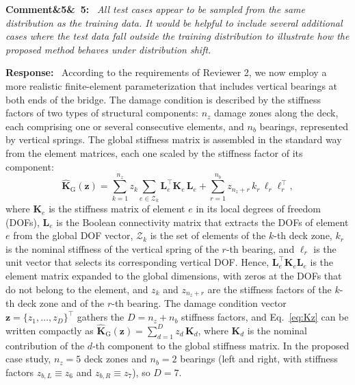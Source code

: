 \documentclass[11pt]{article}
\newenvironment{rcomment}[1]{\par\bigskip\noindent\textbf{Comment\ifx&#1&\else\ #1\fi:}\ \itshape}{\par}
\newenvironment{response}{\par\smallskip\noindent\color{resp}\textbf{Response:}\ }{\par}
\newcommand{\z}{\mathbf{z}}
\begin{document}
\begin{rcomment}{5}
All test cases appear to be sampled from the same distribution as the training data. It would be helpful to include several additional cases where the test data fall outside the training distribution to illustrate how the proposed method behaves under distribution shift.
\end{rcomment}

\begin{response}
According to the requirements of Reviewer 2, we now employ a more realistic finite-element parameterization that includes vertical bearings at both ends of the bridge. 
The damage condition is described by the stiffness factors of two types of structural components: $n_z$ damage zones
along the deck, each comprising one or several consecutive elements, and $n_b$ bearings, represented by vertical springs.
The global stiffness matrix is assembled in the standard way from the element matrices, each one scaled by the
stiffness factor of its component:
\begin{equation}
	\hat{\mathbf{K}}_{\mathrm{G}}(\z)=\sum_{k=1}^{n_z} z_k\sum_{e\in\mathcal{Z}_k}\mathbf{L}_e^{\top}\mathbf{K}_e\,\mathbf{L}_e
	+\sum_{r=1}^{n_b} z_{n_z+r}\,k_r\,\bm{\ell}_r\bm{\ell}_r^{\top},
	\label{eq:Kz}
\end{equation}
where $\mathbf{K}_e$ is the stiffness matrix of element $e$ in its local degrees of freedom (DOFs), $\mathbf{L}_e$ is the Boolean connectivity matrix that extracts the DOFs of element $e$ from the global DOF vector, $\mathcal{Z}_k$ is the set of elements of the $k$-th deck zone, $k_r$ is the nominal stiffness of the vertical spring of the $r$-th bearing, and
$\bm{\ell}_r$ is the unit vector that selects its corresponding vertical DOF.
Hence, $\mathbf{L}_e^{\top}\mathbf{K}_e
\mathbf{L}_e$ is the element matrix expanded to the global dimensions, with zeros at the DOFs that do not belong to the element, and $z_k$ and $z_{n_z+r}$ are the stiffness factors of the $k$-th deck zone and of the $r$-th bearing. 
The damage condition vector $\z=\{z_1,\dots,z_D\}^{\top}$ gathers the $D=n_z+n_b$ stiffness factors, and Eq.~\eqref{eq:Kz} can be written compactly as $\hat{\mathbf{K}}_{\mathrm{G}}(\z)=\sum_{d=1}^{D}z_d\,\mathbf{K}_d$, where $\mathbf{K}_d$ is the nominal
contribution of the $d$-th component to the global stiffness matrix. 
In the proposed case study, $n_z=5$ deck zones and $n_b=2$ bearings (left and right, with stiffness factors $z_{b,L}\equiv z_6$ and $z_{b,R}\equiv z_7$), so $D=7$.


\end{response}
\end{document}
